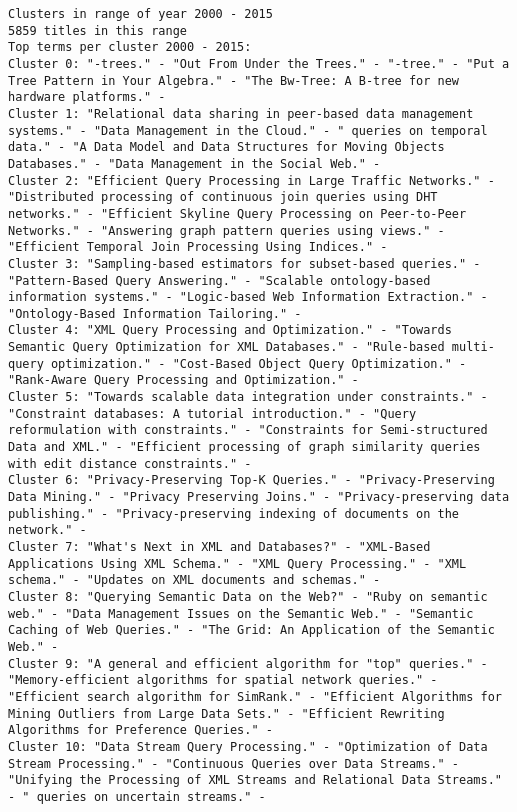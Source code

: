 \documentclass[11pt]{article}
\begin{document}
\begin{verbatim}
Clusters in range of year 2000 - 2015
5859 titles in this range
Top terms per cluster 2000 - 2015:
Cluster 0: "-trees." - "Out From Under the Trees." - "-tree." - "Put a Tree Pattern in Your Algebra." - "The Bw-Tree: A B-tree for new hardware platforms." - 
Cluster 1: "Relational data sharing in peer-based data management systems." - "Data Management in the Cloud." - " queries on temporal data." - "A Data Model and Data Structures for Moving Objects Databases." - "Data Management in the Social Web." - 
Cluster 2: "Efficient Query Processing in Large Traffic Networks." - "Distributed processing of continuous join queries using DHT networks." - "Efficient Skyline Query Processing on Peer-to-Peer Networks." - "Answering graph pattern queries using views." - "Efficient Temporal Join Processing Using Indices." - 
Cluster 3: "Sampling-based estimators for subset-based queries." - "Pattern-Based Query Answering." - "Scalable ontology-based information systems." - "Logic-based Web Information Extraction." - "Ontology-Based Information Tailoring." - 
Cluster 4: "XML Query Processing and Optimization." - "Towards Semantic Query Optimization for XML Databases." - "Rule-based multi-query optimization." - "Cost-Based Object Query Optimization." - "Rank-Aware Query Processing and Optimization." - 
Cluster 5: "Towards scalable data integration under constraints." - "Constraint databases: A tutorial introduction." - "Query reformulation with constraints." - "Constraints for Semi-structured Data and XML." - "Efficient processing of graph similarity queries with edit distance constraints." - 
Cluster 6: "Privacy-Preserving Top-K Queries." - "Privacy-Preserving Data Mining." - "Privacy Preserving Joins." - "Privacy-preserving data publishing." - "Privacy-preserving indexing of documents on the network." - 
Cluster 7: "What's Next in XML and Databases?" - "XML-Based Applications Using XML Schema." - "XML Query Processing." - "XML schema." - "Updates on XML documents and schemas." - 
Cluster 8: "Querying Semantic Data on the Web?" - "Ruby on semantic web." - "Data Management Issues on the Semantic Web." - "Semantic Caching of Web Queries." - "The Grid: An Application of the Semantic Web." - 
Cluster 9: "A general and efficient algorithm for "top" queries." - "Memory-efficient algorithms for spatial network queries." - "Efficient search algorithm for SimRank." - "Efficient Algorithms for Mining Outliers from Large Data Sets." - "Efficient Rewriting Algorithms for Preference Queries." - 
Cluster 10: "Data Stream Query Processing." - "Optimization of Data Stream Processing." - "Continuous Queries over Data Streams." - "Unifying the Processing of XML Streams and Relational Data Streams." - " queries on uncertain streams." - 

\end{verbatim}
\end{document}
